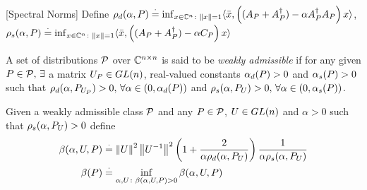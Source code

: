 \documentclass{article}
\begin{document}
\begin{definition}\label{def:spectnorm}[Spectral Norms]
Define $\rhod{P}\eqdef {\inf}_{x\in\C^n\colon\norm{x}=1}\ip{\bar{x},\left((A_P+A_P^\dag)-\alpha A_P^\dag A_P\right)x}$, $\rhos{P}\eqdef{\inf}_{x\in \C^n\colon\norm{x}=1}\ip{\bar{x},\left((A_P+A_P^\dag)-\alpha C_P\right)x}$
\end{definition}

\begin{definition}
A set of distributions $\P$ over $\C^{\ncn}$ is said to be \emph{weakly admissible} if for any given $P\in \P,\,\exists$ a matrix $U_P \in \gln$, real-valued constants $\alphapd>0$ and $\alphaps>0$ such that $\rhod{P_{U_P}}>0,\,\forall \alpha\in(0,\alphapd)$ and $\rhos{P_U}>0,\,\forall \alpha\in(0,\alphaps)$.
\end{definition}
\begin{definition}
Given a weakly admissible class $\P$ and any $P\in\P$, $U\in \gln$ and $\alpha>0$ such that $\rhos{P_{U}}>0$ define
\begin{align*}
\bu&\eqdef \norm{U}^2\norm{U^{-1}}^2 \left(1+\frac2{\alpha\rhod{P_U}}\right)\frac{1}{\alpha \rhos{P_U}}\\
\beta(P)&\eqdef \inf_{\alpha,U\colon \bu>0} \bu
\end{align*}
\end{definition}
\end{document}
